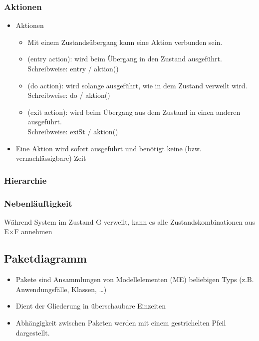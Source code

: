 \subsubsection{Aktionen}
\begin{itemize}
    \item Aktionen
    \begin{itemize}
        \item Mit einem Zustandsübergang kann eine Aktion verbunden sein.
        \item {} (entry action): wird beim Übergang in den Zustand ausgeführt. \\
        Schreibweise: entry / aktion()
        \item {}(do action): wird solange ausgeführt, wie in dem Zustand verweilt wird. \\
        Schreibweise: do / aktion()
        \item {}(exit action): wird beim Übergang aus dem Zustand in einen anderen ausgeführt. \\
        Schreibweise: exiSt / aktion()
    \end{itemize}
    \item Eine Aktion wird sofort ausgeführt und benötigt keine (bzw. vernachlässigbare) Zeit
\end{itemize}

\subsubsection{Hierarchie}

\subsubsection{Nebenläuftigkeit}
Während System im Zustand G verweilt, kann es alle Zustandskombinationen aus E×F annehmen

\subsection{Paketdiagramm}
\begin{itemize}
    \item Pakete sind Ansammlungen von Modellelementen (ME) beliebigen Typs (z.B. Anwendungsfälle, Klassen, …)
    \item Dient der Gliederung in überschaubare Einzeiten
    \item Abhängigkeit zwischen Paketen werden mit einem gestrichelten Pfeil dargestellt.
\end{itemize}


